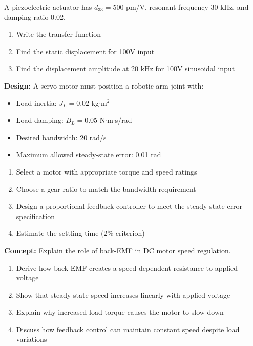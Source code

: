 \begin{exercise}
A piezoelectric actuator has $d_{33} = 500$ pm/V, resonant frequency 30 kHz, and damping ratio 0.02.
\begin{enumerate}[label=(\alph*)]
    \item Write the transfer function
    \item Find the static displacement for 100V input
    \item Find the displacement amplitude at 20 kHz for 100V sinusoidal input
\end{enumerate}
\end{exercise}

\begin{exercise}
\textbf{Design:} A servo motor must position a robotic arm joint with:
\begin{itemize}
    \item Load inertia: $J_L = 0.02$ kg$\cdot$m$^2$
    \item Load damping: $B_L = 0.05$ N$\cdot$m$\cdot$s/rad
    \item Desired bandwidth: 20 rad/s
    \item Maximum allowed steady-state error: 0.01 rad
\end{itemize}

\begin{enumerate}[label=(\alph*)]
    \item Select a motor with appropriate torque and speed ratings
    \item Choose a gear ratio to match the bandwidth requirement
    \item Design a proportional feedback controller to meet the steady-state error specification
    \item Estimate the settling time (2\% criterion)
\end{enumerate}
\end{exercise}

\begin{exercise}
\textbf{Concept:} Explain the role of back-EMF in DC motor speed regulation.

\begin{enumerate}[label=(\alph*)]
    \item Derive how back-EMF creates a speed-dependent resistance to applied voltage
    \item Show that steady-state speed increases linearly with applied voltage
    \item Explain why increased load torque causes the motor to slow down
    \item Discuss how feedback control can maintain constant speed despite load variations
\end{enumerate}
\end{exercise}

